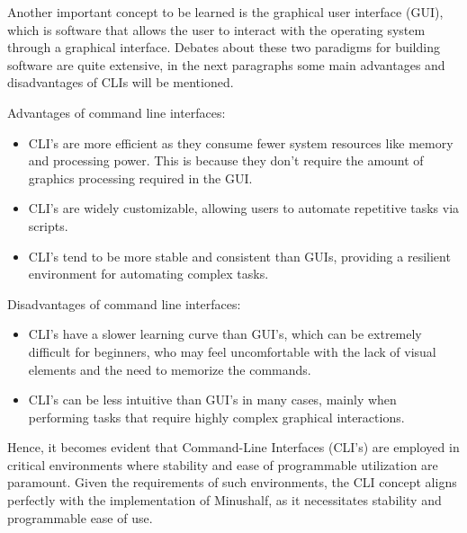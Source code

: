 Another important concept to be learned is the graphical user interface (GUI), which is software that allows the user to interact with the operating system through a graphical interface. Debates about these two paradigms for building software are quite extensive, in the next paragraphs some main advantages and disadvantages of CLIs will be mentioned.

Advantages of command line interfaces:

\begin{itemize}
    \item CLI's are more efficient as they consume fewer system resources like memory and processing power. This is because they don't require the amount of graphics processing required in the GUI.
    \item CLI's are widely customizable, allowing users to automate repetitive tasks via scripts.
    \item CLI's tend to be more stable and consistent than GUIs, providing a resilient environment for automating complex tasks.
\end{itemize}

Disadvantages of command line interfaces:

\begin{itemize}
    \item CLI's have a slower learning curve than GUI's, which can be extremely difficult for beginners, who may feel uncomfortable with the lack of visual elements and the need to memorize the commands.
    \item CLI's can be less intuitive than GUI's in many cases, mainly when performing tasks that require highly complex graphical interactions.
\end{itemize}

Hence, it becomes evident that Command-Line Interfaces (CLI's) are employed in critical environments where stability and ease of programmable utilization are paramount. Given the requirements of such environments, the CLI concept aligns perfectly with the implementation of Minushalf, as it necessitates stability and programmable ease of use.

